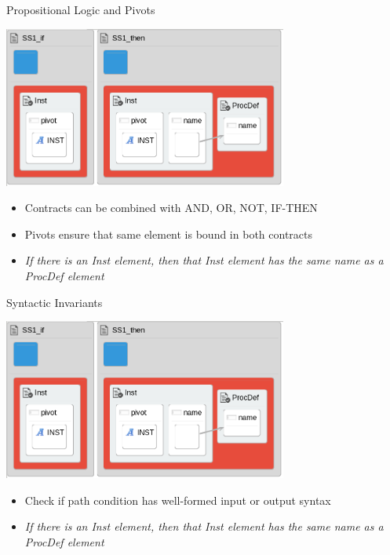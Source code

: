 \documentclass[12pt, handout]{beamer}
\begin{document}
\begin{frame}{Propositional Logic and Pivots}
\begin{center}
\begin{center}
\includegraphics[width=0.7\textwidth]{figures/syntactic_invariant}
\end{center}
\end{center}
\pause
\begin{itemize}[<+->]
\item Contracts can be combined with AND, OR, NOT, IF-THEN
\item Pivots ensure that same element is bound in both contracts
\item  \textit{If there is an Inst element, then that Inst element has the same name as a ProcDef element}
\end{itemize}
\end{frame}

\begin{frame}{Syntactic Invariants}
\begin{center}
\includegraphics[width=0.7\textwidth]{figures/syntactic_invariant}
\end{center}
\begin{itemize}
\item Check if path condition has well-formed input or output syntax
\item \textit{If there is an Inst element, then that Inst element has the same name as a ProcDef element}
\end{itemize}
\end{frame}
\end{document}
